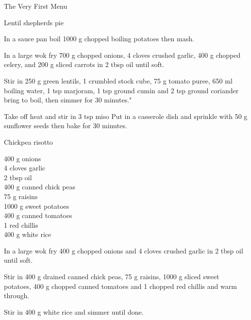 \begin{menu}{The Very First Menu}
\begin{recipe}{2}{Lentil shepherds pie}
\begin{ingredients}
		\end{ingredients}
	
    \begin{instructions}
    \item 
        In a sauce pan boil
        1000 g chopped boiling potatoes
        then mash.
      \item 
        In a large wok fry
        700 g chopped onions,
        4 cloves crushed garlic,
        400 g chopped celery,
        and
        200 g sliced carrots
        in
        2 tbsp  oil
        until soft.
      \item 
        Stir in
        250 g  green lentils,
        1  crumbled stock cube,
        75 g  tomato puree,
        650 ml  boiling water,
        1 tsp  marjoram,
        1 tsp  ground cumin
        and
        2 tsp  ground coriander
        bring to boil,
        then simmer for 30 minutes."
      \item 
        Take off heat and stir in
        3 tsp  miso
        Put in a casserole dish
        and sprinkle with 
        50 g  sunflower seeds
        then bake  for 30 minutes.
      
    \end{instructions}
    \end{recipe}%
  
    \begin{recipe}{2}{Chickpea risotto}%
    
		\begin{ingredients}
		400 g onions  \\
	4 cloves garlic  \\
	2 tbsp oil  \\
	400 g canned chick peas  \\
	75 g raisins  \\
	1000 g sweet potatoes  \\
	400 g canned tomatoes  \\
	1  red chillis  \\
	400 g white rice  \\
	
		\end{ingredients}
	
    \begin{instructions}
    \item 
        In a large wok fry
        400 g chopped onions
        and
        4 cloves crushed garlic
        in
        2 tbsp  oil
        until soft.
      \item 
        Stir in
        400 g drained canned chick peas,
        75 g  raisins,
        1000 g sliced sweet potatoes,
        400 g chopped canned tomatoes
        and
        1  chopped red chillis
        and warm through.
      \item 
        Stir in 
        400 g  white rice
        and simmer until done.
      

\end{instructions}
\end{recipe}
\end{menu}

